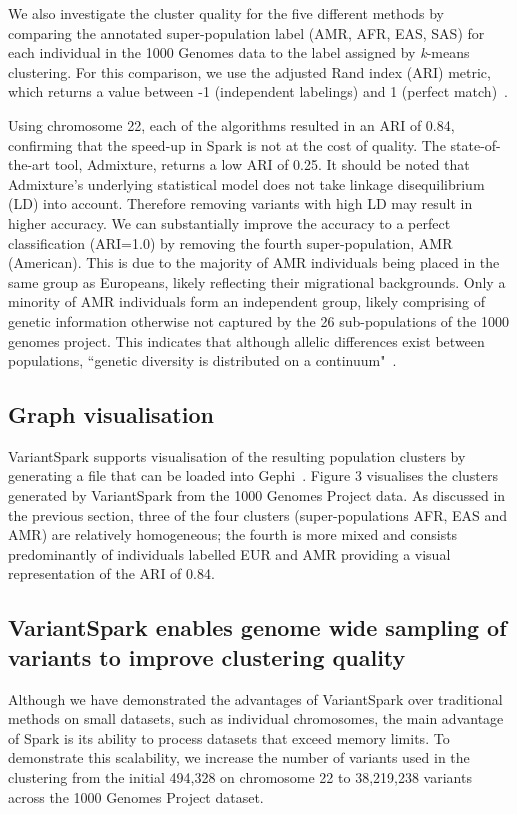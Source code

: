 \documentclass{bmcart}
\newcommand{\variantSpark}{{\sc VariantSpark}}
\newcommand{\kMeans}{\textit{k}-means}
\newcommand{\ARI}{adjusted Rand index}
\begin{document}
We also investigate the cluster quality for the five different methods by comparing the annotated super-population label (AMR, AFR, EAS, SAS) for each individual in the 1000 Genomes data to the label assigned by \kMeans{} clustering. 
For this comparison, we use the \ARI{} (ARI) metric, which returns a value between -1 (independent labelings) and 1 (perfect match)~\cite{Hubert1985}.

Using chromosome 22, each of the algorithms resulted in an ARI of 0.84, confirming that the speed-up in {\sc Spark} is not at the cost of quality.
The state-of-the-art tool, {\sc Admixture}, returns a low ARI of 0.25. It should be noted that {\sc Admixture}'s underlying statistical model does not take linkage disequilibrium (LD) into account. 
Therefore removing variants with high LD may result in higher accuracy. 
We can substantially improve the accuracy to a perfect classification (ARI=1.0) by removing the fourth super-population, AMR (American). 
This is due to the majority of AMR individuals being placed in the same group as Europeans, likely reflecting their migrational backgrounds. 
Only a minority of AMR individuals form an independent group, likely comprising of genetic information otherwise not captured by the 26 sub-populations of the 1000 genomes project.
This indicates that although allelic differences exist between populations, ``genetic diversity is distributed on a continuum"~\cite{Pugach2015}.

\subsection*{Graph visualisation}
\variantSpark{} supports visualisation of the resulting population clusters by generating a file that can be loaded into {\sc Gephi}~\cite{ICWSM09154}.
Figure 3 visualises the clusters generated by \variantSpark{} from the 1000 Genomes Project data. 
As discussed in the previous section, three of the four clusters (super-populations AFR, EAS and AMR) are relatively homogeneous; the fourth is more mixed and 
consists predominantly of individuals labelled EUR and AMR providing a visual representation of the ARI of 0.84.


\subsection*{\variantSpark{} enables genome wide sampling of variants to improve clustering quality}
Although we have demonstrated the advantages of \variantSpark{} over traditional methods on small datasets, such as individual chromosomes, the main advantage of {\sc Spark} is its ability to process datasets that exceed memory limits.
To demonstrate this scalability, we increase the number of variants used in the clustering from the initial 494,328 on chromosome 22 to 38,219,238 variants across the 1000 Genomes Project dataset.
\end{document}
